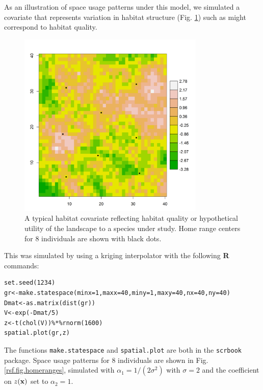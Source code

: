 As an illustration of space usage patterns under this model, we
simulated a covariate that represents 
variation in habitat
structure (Fig. \ref{rsf.fig.habitat}) such as might correspond to
habitat quality.
\begin{figure}
\centering
\includegraphics[width=3.5in,height=3.5in]{Ch10b/figs/habitat}
\caption{A typical habitat covariate reflecting habitat quality or
  hypothetical utility of the landscape to a species under study. Home range centers for 8 individuals are
shown with black dots.}
\label{rsf.fig.habitat}
\end{figure}
This was simulated by using a
kriging interpolator with the following {\bf R} commands:
\begin{verbatim}
set.seed(1234)
gr<-make.statespace(minx=1,maxx=40,miny=1,maxy=40,nx=40,ny=40)
Dmat<-as.matrix(dist(gr))
V<-exp(-Dmat/5)
z<-t(chol(V))%*%rnorm(1600)
spatial.plot(gr,z)
\end{verbatim}
The functions \mbox{\tt make.statespace} and \mbox{\tt spatial.plot} are
both in the \mbox{\tt scrbook} package.
Space usage patterns for
 8 individuals are shown in Fig. \ref{rsf.fig.homeranges},
simulated with $\alpha_{1} = 1/(2\sigma^2)$ with $\sigma = 2$ and the
coefficient on $z({\bf x})$ set to $\alpha_{2} = 1$.
